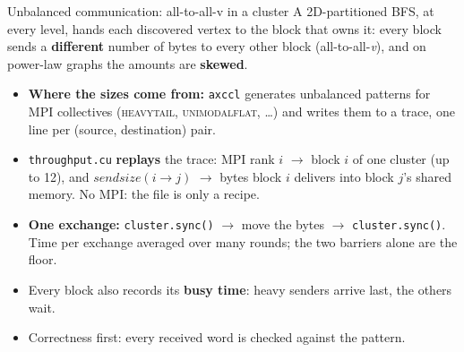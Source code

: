 \documentclass[aspectratio=169, numbering=fraction]{beamer}
\begin{document}
\begin{frame}{Unbalanced communication: all-to-all-v in a cluster}
  \vspace{0.3em}
  \footnotesize
  A 2D-partitioned BFS, at every level, hands each discovered vertex to the block that owns it:
  every block sends a \textbf{different} number of bytes to every other block (all-to-all-\emph{v}),
  and on power-law graphs the amounts are \textbf{skewed}.

  \vspace{0.3em}
  \begin{itemize}\itemsep3pt
    \item \textbf{Where the sizes come from:} \texttt{axccl} generates unbalanced patterns for MPI
          collectives (\textsc{heavytail}, \textsc{unimodalflat}, \dots) and writes them to a trace,
          one line per (source, destination) pair.
    \item \texttt{throughput.cu} \textbf{replays} the trace: MPI rank $i$ $\to$ block $i$ of one
          cluster (up to 12), and $\mathit{sendsize}(i \to j)$ $\to$ bytes block $i$ delivers into
          block $j$'s shared memory. No MPI: the file is only a recipe.
    \item \textbf{One exchange:} \texttt{cluster.sync()} $\to$ move the bytes $\to$ \texttt{cluster.sync()}.
          Time per exchange averaged over many rounds; the two barriers alone are the floor.
    \item Every block also records its \textbf{busy time}: heavy senders arrive last, the others wait.
    \item Correctness first: every received word is checked against the pattern.
  \end{itemize}
\end{frame}
\end{document}
